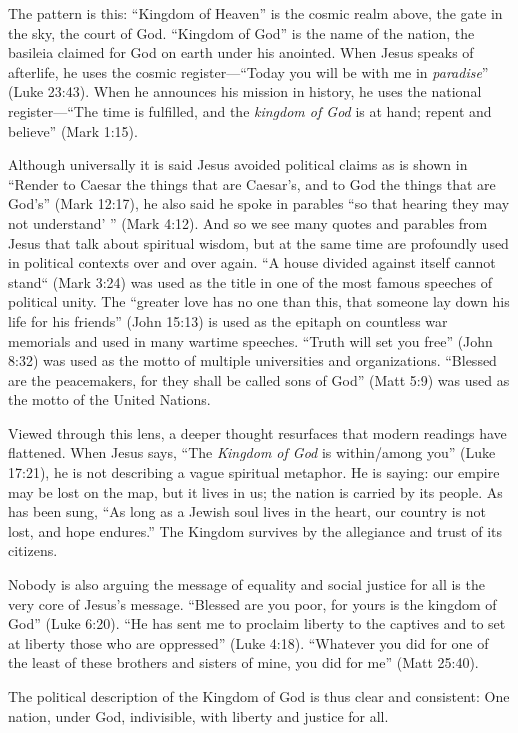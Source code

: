 The pattern is this: ``Kingdom of Heaven'' is the cosmic realm above, the gate in the sky, the court of God.
``Kingdom of God'' is the name of the nation, the basileia claimed for God on earth under his anointed.
When Jesus speaks of afterlife, he uses the cosmic register---``Today you will be with me in \emph{paradise}'' (Luke 23:43).
When he announces his mission in history, he uses the national register---``The time is fulfilled, and the \emph{kingdom of God} is at hand; repent and believe'' (Mark 1:15).

Although universally it is said Jesus avoided political claims as is shown in ``Render to Caesar the things that are Caesar's, and to God the things that are God's'' (Mark 12:17), he also said he spoke in parables ``so that hearing they may not understand' '' (Mark 4:12).
And so we see many quotes and parables from Jesus that talk about spiritual wisdom, but at the same time are profoundly used in political contexts over and over again.
``A house divided against itself cannot stand`` (Mark 3:24) was used as the title in one of the most famous speeches of political unity.
The ``greater love has no one than this, that someone lay down his life for his friends'' (John 15:13) is used as the epitaph on countless war memorials and used in many wartime speeches.
``Truth will set you free'' (John 8:32) was used as the motto of multiple universities and organizations.
``Blessed are the peacemakers, for they shall be called sons of God'' (Matt 5:9) was used as the motto of the United Nations.

Viewed through this lens, a deeper thought resurfaces that modern readings have flattened.
When Jesus says, ``The \emph{Kingdom of God} is within/among you'' (Luke 17:21), he is not describing a vague spiritual metaphor.
He is saying: our empire may be lost on the map, but it lives in us; the nation is carried by its people.
As has been sung, ``As long as a Jewish soul lives in the heart, our country is not lost, and hope endures.''
The Kingdom survives by the allegiance and trust of its citizens.

Nobody is also arguing the message of equality and social justice for all is the very core of Jesus’s message.
“Blessed are you poor, for yours is the kingdom of God” (Luke 6:20).
“He has sent me to proclaim liberty to the captives and to set at liberty those who are oppressed” (Luke 4:18).
“Whatever you did for one of the least of these brothers and sisters of mine, you did for me” (Matt 25:40).

The political description of the Kingdom of God is thus clear and consistent:
One nation, under God, indivisible, with liberty and justice for all.

